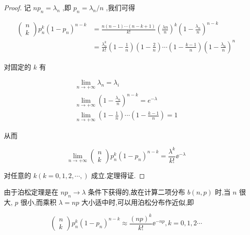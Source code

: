 \begin{proof}
	记 $ n p_{n}=\lambda_{n} $ ,即 $ p_{n}=\lambda_{n} / n $ ,我们可得
	
	\[
	\begin{array}{ll}
	{\left( 
		\begin{array}{l}
		{n} \\ 
		{k}
		\end{array}
		\right) p_{n}^{k}\left(1-p_{n}\right)^{n-k}} & {=\frac{n(n-1) \cdots(n-k+1)}{k !}
		\left(\frac{\lambda n}{n}\right)^{k}
		\left(1-\frac{\lambda_{n}}{n}\right)^{n-k}} \\
	{} & {=\frac{\lambda_{n}^{k}}{k !}
		\left(1-\frac{1}{n}\right)
		\left(1-\frac{2}{n}\right)
		\cdots
		\left(1-\frac{k-1}{n}\right)
		\left(1-\frac{\lambda_{n}}{n}\right)^{n}}
	\end{array}
	\]
	
	对固定的 $ k $ 有
	
	\[
	\begin{array}{l}{\lim _{n \rightarrow+\infty} \lambda_{n}=\lambda_{i}} \\ {\lim _{n \rightarrow+\infty}\left(1-\frac{\lambda_{n}}{n}\right)^{n-k}=e^{-\lambda}} \\ {\lim _{n \rightarrow+\infty}\left(1-\frac{1}{n}\right) \cdots\left(1-\frac{k-1}{n}\right)=1}\end{array}
	\]
	
	从而
	
	\[
	\lim _{n \rightarrow+\infty} \left( \begin{array}{l}{n} \\ {k}\end{array}\right) p_{n}^{k}\left(1-p_{n}\right)^{n-k}=\frac{\lambda^{k}}{k !} \ee ^{-\lambda}
	\]
	
	对任意的 $ k(k=0,1,2, \cdots,) $ 成立.定理得证.
	
\end{proof}

由于泊松定理是在 $ n p_{n} \rightarrow \lambda $ 条件下获得的,故在计算二项分布 $ b(n,p) $ 时,当 $ n $ 很大, $ p $ 很小,而乘积 $ \lambda=n p $ 大小适中时,可以用泊松分布作近似,即

\begin{equation}
\left( \begin{array}{l}{n} \\ {k}\end{array}\right) p_{n}^{k}\left(1-p_{n}\right)^{n-k} \approx \frac{(n p)^{k}}{k !} \ee ^{-n p}, k=0,1,2 \cdots \label{eq:2.4.5}
\end{equation}

